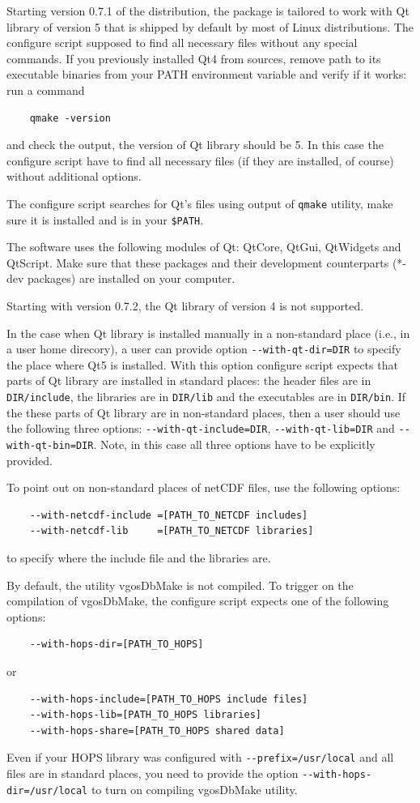 \documentclass [10pt,letterpaper]{report}
\begin{document}
{%
%
%
%
Starting version 0.7.1 of the distribution, the package is tailored to
work with Qt library of version 5 that is shipped by default by most of
Linux distributions. The configure script supposed to find all necessary
files without any special commands. If you previously installed Qt4 from
sources, remove path to its executable binaries from your PATH environment
variable and verify if it works: run a command
\begin{verbatim}
    qmake -version
\end{verbatim}
and check the output, the version of Qt library should be 5. In this
case the configure script have to find all necessary files (if they are
installed, of course) without additional options.

The configure script searches for Qt's files using output of {\tt qmake}
utility, make sure it is installed and is in your {\tt \$PATH}.

The software uses the following modules of Qt: QtCore, QtGui, QtWidgets
and QtScript. Make sure that these packages and their development counterparts
(*-dev packages) are installed on your computer.

Starting with version 0.7.2, the Qt library of version 4 is not supported.

In the case when Qt library is installed manually in a non-standard place (i.e., 
in a user home direcory), a
user can provide option {\tt -{}-with-qt-dir=DIR} to specify the
place where Qt5 is installed. With this option configure script expects
that parts of Qt library are installed in standard places: the header files
are in {\tt DIR/include}, the libraries are in {\tt DIR/lib}
and the executables are in {\tt DIR/bin}. If the these parts of
Qt library are in non-standard places, then a user should use the following
three options: {\tt -{}-with-qt-include=DIR}, {\tt -{}-with-qt-lib=DIR} and
{\tt -{}-with-qt-bin=DIR}. Note, in this case all three options have to be
explicitly provided.




%
%
%
To point out on non-standard places of netCDF files, use the following options:
\begin{verbatim}
    --with-netcdf-include =[PATH_TO_NETCDF includes]
    --with-netcdf-lib     =[PATH_TO_NETCDF libraries]
\end{verbatim}
to specify where the include file and the libraries are.

%
%
%
%
By default, the utility vgosDbMake is not compiled. To trigger on the
compilation of vgosDbMake, the configure script expects one of the following
options:
\begin{verbatim}
    --with-hops-dir=[PATH_TO_HOPS]
\end{verbatim}
or
\begin{verbatim}
    --with-hops-include=[PATH_TO_HOPS include files]
    --with-hops-lib=[PATH_TO_HOPS libraries]
    --with-hops-share=[PATH_TO_HOPS shared data]
\end{verbatim}
Even if your HOPS library was configured with {\tt -{}-prefix=/usr/local} and all
files are in standard places, you need to provide the option {\tt -{}-with-hops-dir=/usr/local}
to turn on compiling vgosDbMake utility.

}
\end{document}

